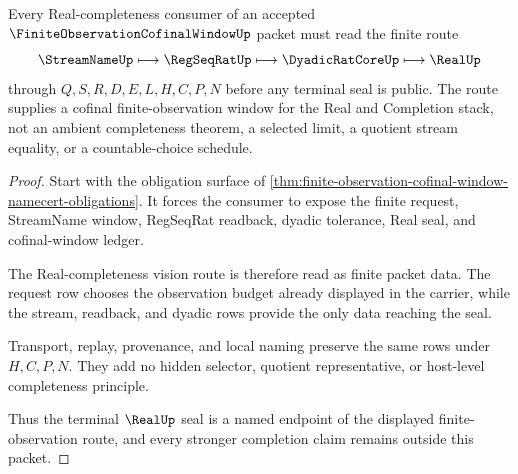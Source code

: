 \begin{theorem}
\label{thm:finite-observation-cofinal-window-real-seal-route}
Every Real-completeness consumer of an accepted $\FiniteObservationCofinalWindowUp$ packet must read the finite route
$$
\StreamNameUp \longmapsto \RegSeqRatUp \longmapsto \DyadicRatCoreUp \longmapsto \RealUp
$$
through $Q,S,R,D,E,L,H,C,P,N$ before any terminal seal is public. The route supplies a cofinal finite-observation window for the Real and Completion stack, not an ambient completeness theorem, a selected limit, a quotient stream equality, or a countable-choice schedule.
\end{theorem}
\begin{proof}
Start with the obligation surface of \autoref{thm:finite-observation-cofinal-window-namecert-obligations}. It forces the consumer to expose the finite request, StreamName window, RegSeqRat readback, dyadic tolerance, Real seal, and cofinal-window ledger.

The Real-completeness vision route is therefore read as finite packet data. The request row chooses the observation budget already displayed in the carrier, while the stream, readback, and dyadic rows provide the only data reaching the seal.

Transport, replay, provenance, and local naming preserve the same rows under $H,C,P,N$. They add no hidden selector, quotient representative, or host-level completeness principle.

Thus the terminal $\RealUp$ seal is a named endpoint of the displayed finite-observation route, and every stronger completion claim remains outside this packet.
\end{proof}



